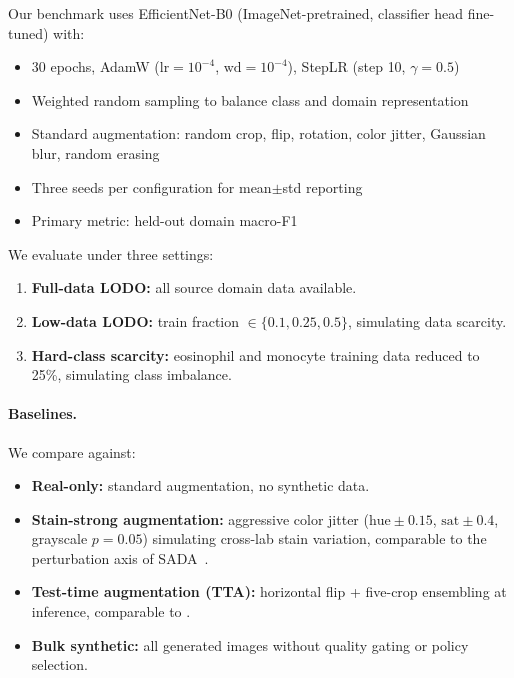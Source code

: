 \documentclass[10pt,twocolumn]{article}
\begin{document}
Our benchmark uses EfficientNet-B0 (ImageNet-pretrained, classifier head
fine-tuned) with:
\begin{itemize}[leftmargin=*,nosep]
\item 30 epochs, AdamW ($\text{lr}=10^{-4}$, $\text{wd}=10^{-4}$),
  StepLR (step 10, $\gamma=0.5$)
\item Weighted random sampling to balance class and domain representation
\item Standard augmentation: random crop, flip, rotation, color jitter,
  Gaussian blur, random erasing
\item Three seeds per configuration for mean$\pm$std reporting
\item Primary metric: held-out domain macro-F1
\end{itemize}

We evaluate under three settings:
\begin{enumerate}[leftmargin=*,nosep]
\item \textbf{Full-data LODO:} all source domain data available.
\item \textbf{Low-data LODO:} train fraction $\in \{0.1, 0.25, 0.5\}$,
  simulating data scarcity.
\item \textbf{Hard-class scarcity:} eosinophil and monocyte training
  data reduced to 25\%, simulating class imbalance.
\end{enumerate}

\paragraph{Baselines.}
We compare against:
\begin{itemize}[leftmargin=*,nosep]
\item \textbf{Real-only:} standard augmentation, no synthetic data.
\item \textbf{Stain-strong augmentation:} aggressive color jitter
  ($\text{hue}\pm0.15$, $\text{sat}\pm0.4$, grayscale $p=0.05$)
  simulating cross-lab stain variation, comparable to the perturbation
  axis of SADA~\citep{li2024stainawaredomainalignmentimbalance}.
\item \textbf{Test-time augmentation (TTA):} horizontal flip +
  five-crop ensembling at inference, comparable to
  \citet{Putzu_2025}.
\item \textbf{Bulk synthetic:} all generated images without quality
  gating or policy selection.
\end{itemize}

\end{document}
